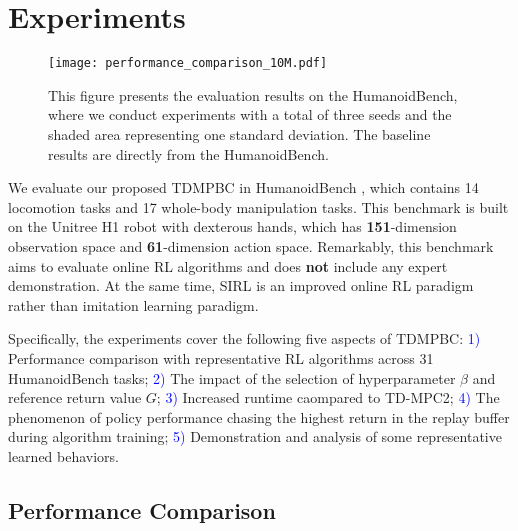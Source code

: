 \section{Experiments}

\begin{figure*}[htbp]
\vspace{-14pt}
  \centering
    \texttt{[image: performance\_comparison\_10M.pdf]}
  \caption{This figure presents the evaluation results on the HumanoidBench, where we conduct experiments with a total of three seeds and the shaded area representing one standard deviation. The baseline results are directly from the HumanoidBench.}\label{fig:main_result}
\end{figure*}
We evaluate our proposed TDMPBC in HumanoidBench \citep{sferrazza2024humanoidbench}, which contains 14 locomotion tasks and 17 whole-body manipulation tasks.
This benchmark is built on the Unitree H1 robot with dexterous hands, which has \textbf{151}-dimension observation space and \textbf{61}-dimension action space.
Remarkably, this benchmark aims to evaluate online RL algorithms and does \textbf{not} include any expert demonstration.
At the same time, SIRL is an improved online RL paradigm rather than imitation learning paradigm.

Specifically, the experiments cover the following five aspects of TDMPBC: 
\textcolor{blue}{1)} Performance comparison with representative RL algorithms across 31 HumanoidBench tasks;
\textcolor{blue}{2)} The impact of the selection of hyperparameter $\beta$ and reference return value $G$;
\textcolor{blue}{3)} Increased runtime caompared to TD-MPC2;
\textcolor{blue}{4)} The phenomenon of policy performance chasing the highest return in the replay buffer during algorithm training;
\textcolor{blue}{5)} Demonstration and analysis of some representative learned behaviors.

\subsection{Performance Comparison}
